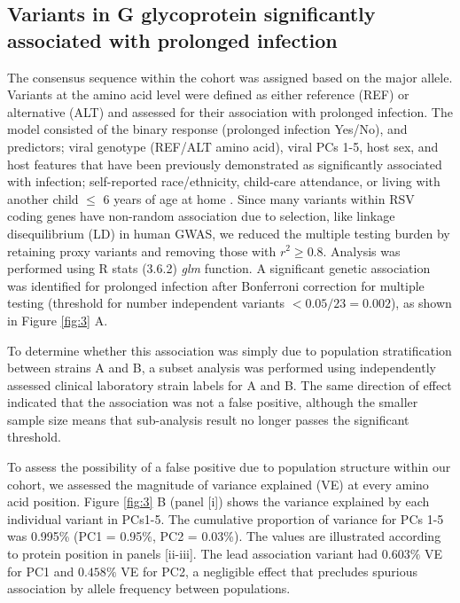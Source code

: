 \documentclass{article} %
\begin{document}
\subsection{Variants in G glycoprotein significantly associated with prolonged infection}
The consensus sequence within the cohort was assigned based on the major allele.
Variants at the amino acid level were defined as either reference (REF) or alternative (ALT) and assessed for their association with prolonged infection.
The model consisted of 
the binary response (prolonged infection Yes/No),
and predictors; viral genotype (REF/ALT amino acid), viral PCs 1-5, host sex, and host features that have been previously demonstrated as significantly associated with infection;
self-reported race/ethnicity, child-care attendance, or living with another child $\le$ 6 years of age at home
\citep{hall1976respiratory}.
Since many variants within RSV coding genes have non-random association due to selection, like linkage disequilibrium (LD) in human GWAS, 
we reduced the multiple testing burden by retaining proxy variants and removing those with
$r^2 \ge 0.8$.
Analysis was performed using R stats (3.6.2) \textit{glm} function. 
A significant genetic association was identified for prolonged infection after Bonferroni correction for multiple testing (threshold for number independent variants $< 0.05/23 = 0.002$), 
as shown in 
Figure \ref{fig:3} A. 

To determine whether this association was simply due to population stratification between strains A and B, a subset analysis was performed using independently assessed clinical laboratory strain labels for A and B.
The same direction of effect indicated that the association was not a false positive, although the smaller sample size means that sub-analysis result no longer passes the significant threshold. 

To assess the possibility of a false positive due to population structure within our cohort,
we assessed the magnitude of variance explained (VE) at every amino acid position.
Figure \ref{fig:3} B (panel [i]) shows the variance explained by each individual variant in PCs1-5.
The cumulative proportion of variance for PCs 1-5 was 0.995\% (PC1 = 0.95\%, PC2 = 0.03\%).
The values are illustrated according to protein position in panels [ii-iii].
The lead association variant had 
$0.603\%$ VE for PC1 and $0.458\%$ VE for PC2,
a negligible effect that precludes spurious association by allele frequency between populations.
\end{document}

